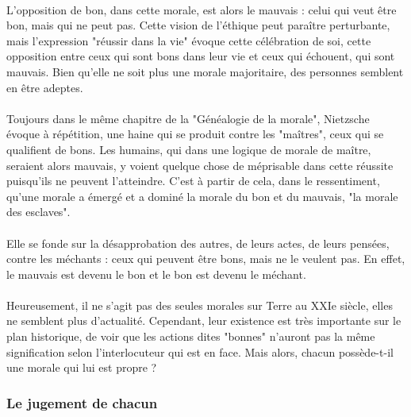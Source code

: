 \documentclass[10pt, french, a4paper]{article}
\begin{document}
\paragraph{}
L’opposition de bon, dans cette morale, est alors le mauvais : celui qui veut être bon, mais qui ne peut pas. Cette vision de l’éthique peut paraître perturbante, mais l’expression "réussir dans la vie" évoque cette célébration de soi, cette opposition entre ceux qui sont bons dans leur vie et ceux qui échouent, qui sont mauvais. Bien qu’elle ne soit plus une morale majoritaire, des personnes semblent en être adeptes.

\paragraph{}
Toujours dans le même chapitre de la "Généalogie de la morale", Nietzsche évoque à répétition, une haine qui se produit contre les "maîtres", ceux qui se qualifient de bons. Les humains, qui dans une logique de morale de maître, seraient alors mauvais, y voient quelque chose de méprisable dans cette réussite puisqu’ils ne peuvent l’atteindre. C’est à partir de cela, dans le ressentiment, qu’une morale a émergé et a dominé la morale du bon et du mauvais, "la morale des esclaves".

\paragraph{}
Elle se fonde sur la désapprobation des autres, de leurs actes, de leurs pensées, contre les méchants : ceux qui peuvent être bons, mais ne le veulent pas. En effet, le mauvais est devenu le bon et le bon est devenu le méchant.

\paragraph{}
Heureusement, il ne s’agit pas des seules morales sur Terre au XXIe siècle, elles ne semblent plus d’actualité. Cependant, leur existence est très importante sur le plan historique, de voir que les actions dites "bonnes" n’auront pas la même signification selon l’interlocuteur qui est en face. Mais alors, chacun possède-t-il une morale qui lui est propre ?

\subsubsection{Le jugement de chacun}
\label{subsec:ethique_jugement_chacun}
\end{document}
